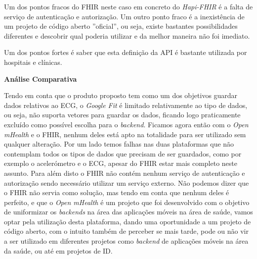 Um dos pontos fracos do FHIR neste caso em concreto do \textit{Hapi-FHIR} é a falta de serviço de autenticação e autorização. Um outro ponto fraco é a inexistência de um projeto de código aberto ''oficial'', ou seja, existe bastantes possibilidades diferentes e descobrir qual poderia utilizar e da melhor maneira não foi imediato.
\par
Um dos pontos fortes é saber que esta definição da \gls{API} é bastante utilizada por hospitais e clínicas.
\par
\textbf{Análise Comparativa}
\par
Tendo em conta que o produto proposto tem como um dos objetivos guardar dados relativos ao \gls{ECG}, o \textit{Google Fit} é limitado relativamente ao tipo de dados, ou seja, não suporta vetores para guardar os dados, ficando logo praticamente excluído como possível escolha para o \textit{backend}.
Ficamos agora então com o \textit{Open mHealth} e o \gls{FHIR}, nenhum deles está apto na totalidade para ser utilizado sem qualquer alteração. Por um lado temos falhas nas duas plataformas que não contemplam todos os tipos de dados que precisam de ser guardados, como por exemplo o acelerómetro e o \gls{ECG}, apesar do \gls{FHIR} estar mais completo neste assunto.
Para além disto o \gls{FHIR} não contém nenhum serviço de autenticação e autorização sendo necessário utilizar um serviço externo.
Não podemos dizer que o \gls{FHIR} não servia como solução, mas tendo em conta que nenhum deles é perfeito, e que o \textit{Open mHealth} é um projeto que foi desenvolvido com o objetivo de uniformizar os \textit{backends} na área das aplicações móveis na área de saúde, vamos optar pela utilização desta plataforma, dando uma oportunidade a um projeto de código aberto, com o intuito também de perceber se mais tarde, pode ou não vir a ser utilizado em diferentes projetos como \textit{backend} de aplicações móveis na área da saúde, ou até em projetos de \gls{ID}.

\cleardoublepage